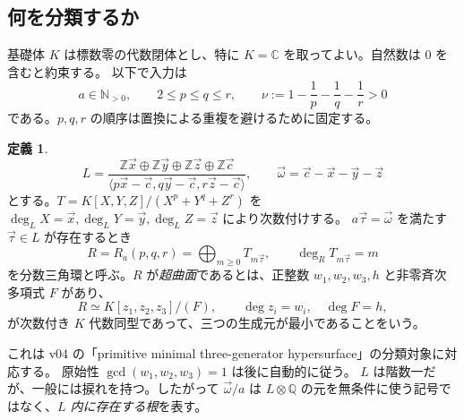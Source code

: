\documentclass[11pt,a4paper]{ltjsarticle}
\numberwithin{equation}{section}
\theoremstyle{definition}
\newtheorem{definition}[theorem]{定義}
\newcommand{\Z}{\mathbb Z}\newcommand{\N}{\mathbb N}\newcommand{\Q}{\mathbb Q}\newcommand{\C}{\mathbb C}
\newcommand{\xx}{\vec x}\newcommand{\yy}{\vec y}\newcommand{\zz}{\vec z}\newcommand{\cc}{\vec c}\newcommand{\ww}{\vec\omega}\newcommand{\ttau}{\vec\tau}
\begin{document}
\subsection{何を分類するか}
基礎体 $K$ は標数零の代数閉体とし、特に $K=\C$ を取ってよい。自然数は $0$ を含むと約束する。
以下で入力は
\begin{equation}\label{eq:input}
 a\in\N_{>0},\qquad 2\le p\le q\le r,\qquad
 \nu:=1-\frac1p-\frac1q-\frac1r>0
\end{equation}
である。$p,q,r$ の順序は置換による重複を避けるために固定する。
\begin{definition}\label{def:ring}
\[
 L=\frac{\Z\xx\oplus\Z\yy\oplus\Z\zz\oplus\Z\cc}
 {\langle p\xx-\cc,q\yy-\cc,r\zz-\cc\rangle},
 \qquad \ww=\cc-\xx-\yy-\zz
\]
とする。$T=K[X,Y,Z]/(X^p+Y^q+Z^r)$ を
$\deg_L X=\xx,\deg_LY=\yy,\deg_LZ=\zz$ により次数付けする。
$a\ttau=\ww$ を満たす $\ttau\in L$ が存在するとき
\[
 R=R_a(p,q,r)=\bigoplus_{m\ge0}T_{m\ttau},\qquad \deg_R T_{m\ttau}=m
\]
を分数三角環と呼ぶ。$R$ が\emph{超曲面}であるとは、正整数 $w_1,w_2,w_3,h$ と非零斉次多項式 $F$ があり、
\begin{equation}\label{eq:hs}
 R\simeq K[z_1,z_2,z_3]/(F),\qquad \deg z_i=w_i,\quad\deg F=h,
\end{equation}
が次数付き $K$ 代数同型であって、三つの生成元が最小であることをいう。
\end{definition}
これは v04 の「primitive minimal three-generator hypersurface」の分類対象に対応する\cite{v04}。
原始性 $\gcd(w_1,w_2,w_3)=1$ は後に自動的に従う。
$L$ は階数一だが、一般には捩れを持つ。したがって $\ww/a$ は
$L\otimes\Q$ の元を無条件に使う記号ではなく、\emph{$L$ 内に存在する根}を表す。
\end{document}
